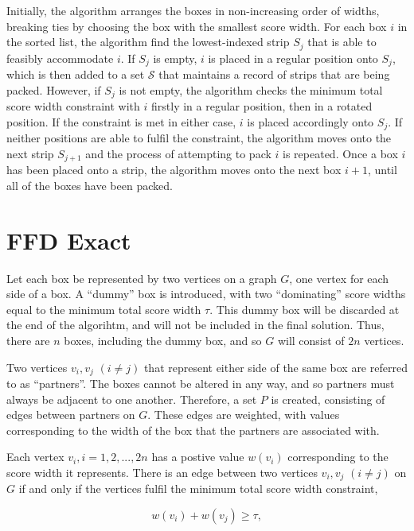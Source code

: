 \documentclass[oribibl]{llncs}
\begin{document}
Initially, the algorithm arranges the boxes in non-increasing order of widths, breaking ties by choosing the box with the smallest score width. For each box $i$ in the sorted list, the algorithm find the lowest-indexed strip $S_j$ that is able to feasibly accommodate $i$. If $S_j$ is empty, $i$ is placed in a regular position onto $S_j$, which is then added to a set $\mathcal{S}$ that maintains a record of strips that are being packed. However, if $S_j$ is not empty, the algorithm checks the minimum total score width constraint with $i$ firstly in a regular position, then in a rotated position. If the constraint is met in either case, $i$ is placed accordingly onto $S_j$. If neither positions are able to fulfil the constraint, the algorithm moves onto the next strip $S_{j+1}$ and the process of attempting to pack $i$ is repeated. Once a box $i$ has been placed onto a strip, the algorithm moves onto the next box $i+1$, until all of the boxes have been packed. 


\section{FFD Exact}
\label{sec:ffdexact}

Let each box be represented by two vertices on a graph $G$, one vertex for each side of a box. A ``dummy'' box is introduced, with two ``dominating'' score widths equal to the minimum total score width $\tau$. This dummy box will be discarded at the end of the algorihtm, and will not be included in the final solution. Thus, there are $n$ boxes, including the dummy box, and so $G$ will consist of $2n$ vertices.

Two vertices $v_i, v_j$ $(i \neq j)$ that represent either side of the same box are referred to as ``partners''. The boxes cannot be altered in any way, and so partners must always be adjacent to one another. Therefore, a set $P$ is created, consisting of edges between partners on $G$. These edges are weighted, with values corresponding to the width of the box that the partners are associated with.

Each vertex $v_i, i = 1, 2, ..., 2n$ has a postive value $w(v_i)$ corresponding to the score width it represents. There is an edge between two vertices $v_i, v_j$ $(i \neq j)$ on $G$ if and only if the vertices fulfil the minimum total score width constraint,

\begin{equation*}
	w(v_i) + w(v_j) \geq \tau,
\end{equation*}
\end{document}
